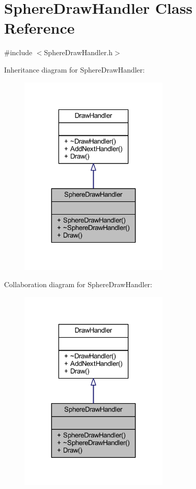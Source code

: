 \hypertarget{class_sphere_draw_handler}{}\section{Sphere\+Draw\+Handler Class Reference}
\label{class_sphere_draw_handler}


{\ttfamily \#include $<$Sphere\+Draw\+Handler.\+h$>$}



Inheritance diagram for Sphere\+Draw\+Handler\+:
\nopagebreak
\begin{figure}[H]
\begin{center}
\leavevmode
\includegraphics[width=203pt]{class_sphere_draw_handler__inherit__graph}
\end{center}
\end{figure}


Collaboration diagram for Sphere\+Draw\+Handler\+:
\nopagebreak
\begin{figure}[H]
\begin{center}
\leavevmode
\includegraphics[width=203pt]{class_sphere_draw_handler__coll__graph}
\end{center}
\end{figure}
